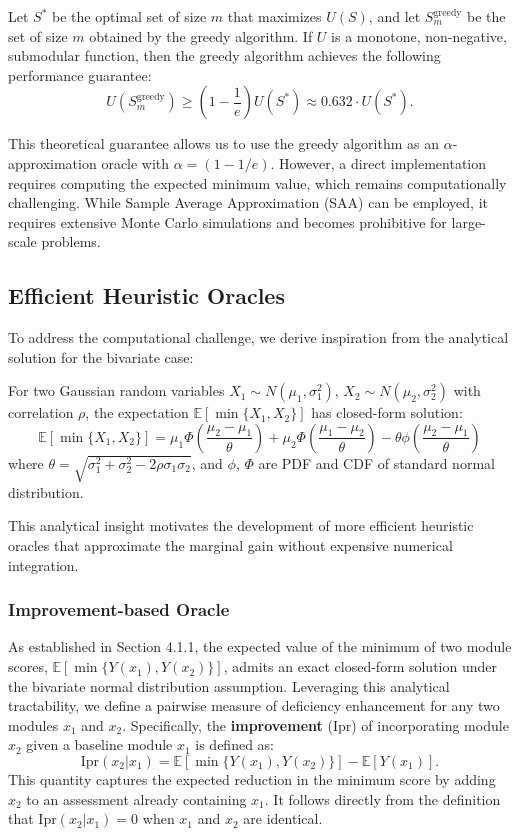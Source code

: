 \documentclass[opre,sglanonrev]{informs4}
\begin{document}
\begin{theorem}
\label{thm:greedy_guarantee}
Let $S^*$ be the optimal set of size $m$ that maximizes $U(S)$, and let $S^{\text{greedy}}_m$ be the set of size $m$ obtained by the greedy algorithm. If $U$ is a monotone, non-negative, submodular function, then the greedy algorithm achieves the following performance guarantee:
$$
U(S^{\text{greedy}}_m) \geq \left(1 - \frac{1}{e}\right) U(S^*) \approx 0.632 \cdot U(S^*).
$$
\end{theorem}


This theoretical guarantee allows us to use the greedy algorithm as an $\alpha$-approximation oracle with $\alpha = (1 - 1/e)$. However, a direct implementation requires computing the expected minimum value, which remains computationally challenging. While Sample Average Approximation (SAA) can be employed, it requires extensive Monte Carlo simulations and becomes prohibitive for large-scale problems.

\subsection{Efficient Heuristic Oracles}
\label{heuristic}
To address the computational challenge, we derive inspiration from the analytical solution for the bivariate case:

\begin{lemma}
\label{lem:bivariate}
For two Gaussian random variables $X_1\sim N(\mu_1,\sigma^2_1)$, $X_2\sim N(\mu_2,\sigma^2_2)$ with correlation $\rho$, the expectation $\mathbb{E}[\min\{X_1, X_2\}]$ has closed-form solution:
$$
\mathbb{E}[\min\{X_1, X_2\}] = \mu_1\Phi(\frac{\mu_2-\mu_1}{\theta}) + \mu_2\Phi(\frac{\mu_1-\mu_2}{\theta}) - \theta \phi(\frac{\mu_2-\mu_1}{\theta} )
$$
where $\theta = \sqrt{\sigma^2_1+\sigma^2_2-2\rho \sigma_1\sigma_2}$, and $\phi$, $\Phi$ are PDF and CDF of standard normal distribution.
\end{lemma}

This analytical insight motivates the development of more efficient heuristic oracles that approximate the marginal gain without expensive numerical integration.

\subsubsection{Improvement-based Oracle}

As established in Section 4.1.1, the expected value of the minimum of two module scores, $\mathbb{E}[\min\{Y(x_1), Y(x_2)\}]$, admits an exact closed-form solution under the bivariate normal distribution assumption. Leveraging this analytical tractability, we define a pairwise measure of deficiency enhancement for any two modules $x_1$ and $x_2$. Specifically, the \textbf{improvement} (Ipr) of incorporating module $x_2$ given a baseline module $x_1$ is defined as:
$$
\text{Ipr}(x_2 | x_1) = \mathbb{E}[\min\{Y(x_1), Y(x_2)\}] - \mathbb{E}[Y(x_1)].
$$
This quantity captures the expected reduction in the minimum score by adding $x_2$ to an assessment already containing $x_1$. It follows directly from the definition that $\text{Ipr}(x_2 | x_1) = 0$ when $x_1$ and $x_2$ are identical.
\end{document}
